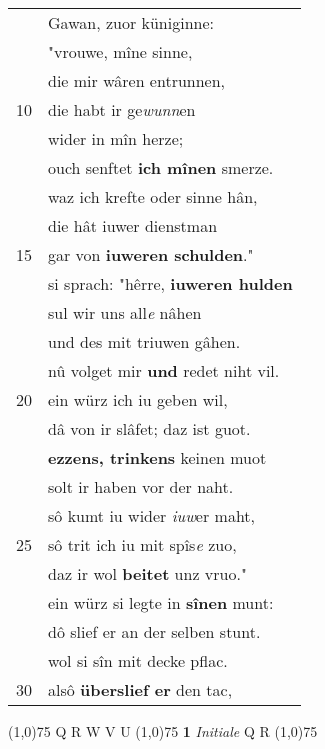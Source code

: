 \documentclass[8pt,a4paper,notitlepage]{article}
\begin{document}
\begin{table}[ht]
\begin{minipage}[t]{0.5\linewidth}
\begin{tabular}{rl}
 & Gawan, zuor küniginne:\\ 
 & "vrouwe, mîne sinne,\\ 
 & die mir wâren entrunnen,\\ 
10 & die habt ir ge\textit{wunn}en\\ 
 & wider in mîn herze;\\ 
 & ouch senftet \textbf{ich mînen} smerze.\\ 
 & waz ich krefte oder sinne hân,\\ 
 & die hât iuwer dienstman\\ 
15 & gar von \textbf{iuweren schulden}."\\ 
 & si sprach: "hêrre, \textbf{iuweren hulden}\\ 
 & sul wir uns all\textit{e} nâhen\\ 
 & und des mit triuwen gâhen.\\ 
 & nû volget mir \textbf{und} redet niht vil.\\ 
20 & ein würz ich iu geben wil,\\ 
 & dâ von ir slâfet; daz ist guot.\\ 
 & \textbf{ezzens, trinkens} keinen muot\\ 
 & solt ir haben vor der naht.\\ 
 & sô kumt iu wider \textit{iuw}er maht,\\ 
25 & sô trit ich iu mit spîs\textit{e} zuo,\\ 
 & daz ir wol \textbf{beitet} unz vruo."\\ 
 & ein würz si legte in \textbf{sînen} munt:\\ 
 & dô slief er an der selben stunt.\\ 
 & wol si sîn mit decke pflac.\\ 
30 & alsô \textbf{überslief er} den tac,\\ 
\end{tabular}
\scriptsize
\line(1,0){75} \newline
Q R W V U \newline
\line(1,0){75} \newline
\textbf{1} \textit{Initiale} Q R  \newline
\line(1,0){75} \newline

\end{minipage}
\end{table}
\end{document}
